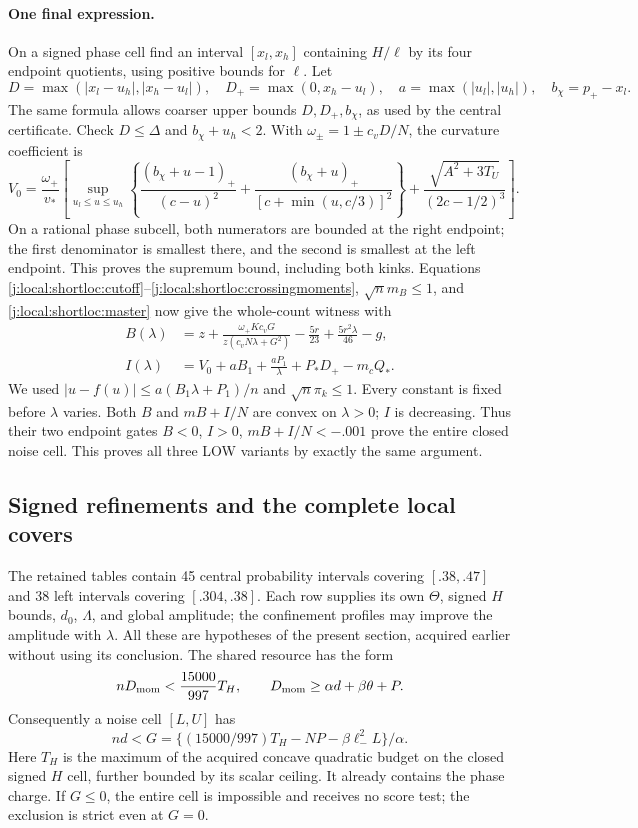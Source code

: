 \paragraph{One final expression.}
On a signed phase cell find an interval $[x_l,x_h]$ containing $H/\ell$
by its four endpoint quotients, using positive bounds for $\ell$.
Let
\[
 D=\max(|x_l-u_h|,|x_h-u_l|),\quad
 D_+=\max(0,x_h-u_l),\quad a=\max(|u_l|,|u_h|),\quad b_\chi=p_+-x_l.
\]
The same formula allows coarser upper bounds $D,D_+,b_\chi$, as used by
the central certificate. Check $D\le\Delta$ and $b_\chi+u_h<2$.
With $\omega_\pm=1\pm c_vD/N$, the curvature coefficient is
\begin{equation}\label{j:local:shortloc:V}
 V_0=\frac{\omega_+}{v_*}\left[
 \sup_{u_l\le u\le u_h}\left\{
 \frac{(b_\chi+u-1)_+}{(c-u)^2}
 +\frac{(b_\chi+u)_+}{[c+\min(u,c/3)]^2}\right\}
 +\frac{\sqrt{A^2+3T_U}}{(2c-1/2)^3}\right].
\end{equation}
On a rational phase subcell, both numerators are bounded at the right
endpoint; the first denominator is smallest there, and the second is
smallest at the left endpoint. This proves the supremum bound, including
both kinks. Equations \eqref{j:local:shortloc:cutoff}--\eqref{j:local:shortloc:crossingmoments},
$\sqrt n m_B\le1$, and \eqref{j:local:shortloc:master} now give the whole-count
witness with
\begin{align}\label{j:local:shortloc:BI}
 B(\lambda)&=z+\frac{\omega_+Kc_vG}{z(c_vN\lambda+G^2)}
                      -\frac{5r}{23}+\frac{5r^2\lambda}{46}-g,\\
 I(\lambda)&=V_0+aB_1+\frac{aP_1}{\lambda}+P_*D_+-m_cQ_*.
 \nonumber
\end{align}
We used $|u-f(u)|\le a(B_1\lambda+P_1)/n$ and $\sqrt n\pi_k\le1$.
Every constant is fixed before $\lambda$ varies. Both $B$ and
$mB+I/N$ are convex on $\lambda>0$; $I$ is decreasing. Thus their two
endpoint gates $B<0$, $I>0$, $mB+I/N<-.001$ prove the entire closed noise
cell. This proves all three LOW variants by exactly the same argument.

\subsection{Signed refinements and the complete local covers}

The retained tables contain 45 central probability intervals covering
$[.38,.47]$ and 38 left intervals covering $[.304,.38]$. Each row supplies
its own $\Theta$, signed $H$ bounds, $d_0$, $\Lambda$, and global amplitude;
the confinement profiles may improve the amplitude with $\lambda$.
All these are hypotheses of the present section, acquired earlier without
using its conclusion. The shared resource has the form
\[
 nD_{\rm mom}<\frac{15000}{997}T_H,\qquad
 D_{\rm mom}\ge\alpha d+\beta\theta+P.
\]
Consequently a noise cell $[L,U]$ has
\[
 nd<G=\{(15000/997)T_H-NP-\beta\ell_-^2L\}/\alpha.
\]
Here $T_H$ is the maximum of the acquired concave quadratic budget on the
closed signed $H$ cell, further bounded by its scalar ceiling. It already
contains the phase charge. If $G\le0$, the entire cell is impossible and
receives no score test; the exclusion is strict even at $G=0$.

